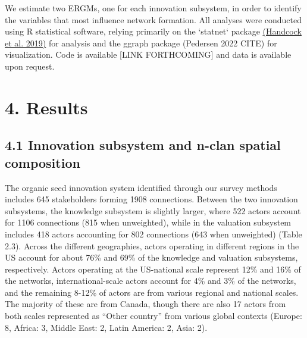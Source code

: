 \documentclass[twoside,12pt,final]{ucthesis-CA2012}
\begin{document}
\begin{ucmainmatter}
We estimate two ERGMs, one for each innovation subsystem, in order to
identify the variables that most influence network formation. All
analyses were conducted using R statistical software, relying primarily
on the `statnet` package \href{https://www.zotero.org/google-docs/?CFTBYJ}{(Handcock et al.
2019)} for analysis and the
\textquotesingle ggraph\textquotesingle{} package (Pedersen 2022 CITE) for visualization. Code is
available {[}LINK FORTHCOMING{]} and data is available upon request.

\hypertarget{results-1}{%
\section{4. Results}\label{results-1}}

\hypertarget{innovation-subsystem-and-n-clan-spatial-composition}{%
\subsection{4.1 Innovation subsystem and n-clan spatial composition}\label{innovation-subsystem-and-n-clan-spatial-composition}}

The organic seed innovation system identified through our survey methods
includes 645 stakeholders forming 1908 connections. Between the two
innovation subsystems, the knowledge subsystem is slightly larger, where
522 actors account for 1106 connections (815 when unweighted), while in
the valuation subsystem includes 418 actors accounting for 802
connections (643 when unweighted) (Table 2.3). Across the different
geographies, actors operating in different regions in the US account for
about 76\% and 69\% of the knowledge and valuation subsystems,
respectively. Actors operating at the US-national scale represent 12\%
and 16\% of the networks, international-scale actors account for 4\% and
3\% of the networks, and the remaining 8-12\% of actors are from various
regional and national scales. The majority of these are from Canada,
though there are also 17 actors from both scales represented as ``Other
country'' from various global contexts (Europe: 8, Africa: 3, Middle
East: 2, Latin America: 2, Asia: 2).
\begin{table}


\end{table}
\end{ucmainmatter}
\end{document}
